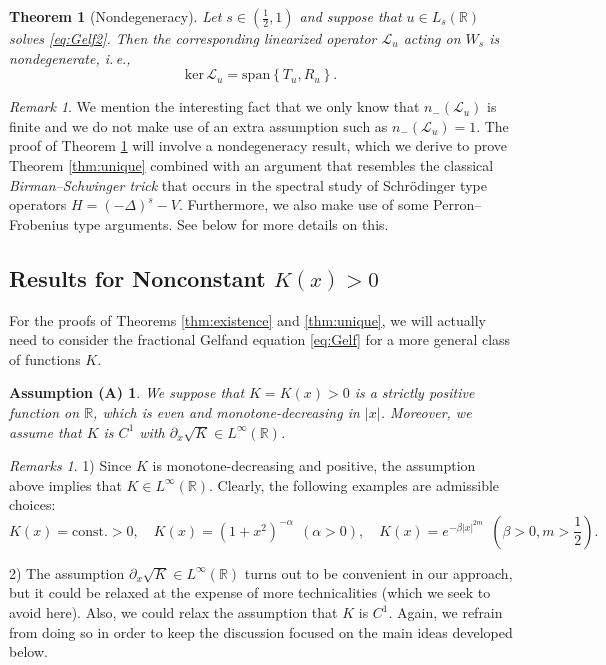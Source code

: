 \documentclass[reqno,10pt,a4paper]{amsart}
\newtheorem{thm}{Theorem}[section]
\newtheorem*{assum}{Assumption (A)}
\theoremstyle{definition}
\theoremstyle{definition}
\theoremstyle{remark}
\theoremstyle{remark}
\newtheorem*{remarks*}{Remarks}
\newtheorem*{remark*}{Remark}
\numberwithin{equation}{section}
\newcommand{\R}{\mathbb{R}}
\newcommand{\pt}{\partial}
\newcommand{\DD}{\Delta}
\newcommand{\LL}{\mathcal{L}}
\begin{document}
\begin{thm}[Nondegeneracy] \label{thm:nondeg}
Let $s \in (\frac 1 2,1)$ and suppose that $u \in L_s(\R)$ solves \eqref{eq:Gelf2}. Then the corresponding linearized operator $\LL_u$ acting on $W_s$ is nondegenerate, i.\,e., 
$$
\mathrm{ker} \, \LL_u = \mathrm{span} \left \{ T_u, R_u \right \}.
$$ 
\end{thm}

\begin{remark*}
We mention the interesting fact that we only know that $n_-(\LL_u)$ is finite and we do not make use of an extra assumption such as $n_-(\LL_u) =1$. The proof of Theorem \ref{thm:nondeg} will involve a nondegeneracy result, which we derive to prove Theorem \ref{thm:unique} combined with an argument that resembles the classical {\em Birman--Schwinger trick} that occurs in the spectral study of Schr\"odinger type operators $H=(-\DD)^s  -V$. Furthermore, we also make use of some Perron--Frobenius type arguments. See below for more details on this.
\end{remark*}


\subsection{Results for Nonconstant $K(x) >0$}

For the proofs of Theorems \ref{thm:existence} and \ref{thm:unique}, we will actually need to consider the fractional Gelfand equation \eqref{eq:Gelf} for a more general class of functions $K$.  

\begin{assum}
We suppose that $K=K(x)>0$ is a strictly positive function on $\R$, which is even and monotone-decreasing in $|x|$. Moreover, we assume that $K$ is $C^1$ with $\pt_x \sqrt{K} \in L^\infty(\R)$. 
\end{assum}

\begin{remarks*}
1) Since $K$ is monotone-decreasing and positive, the assumption above implies that $K \in L^\infty(\R)$. Clearly, the following examples are admissible choices:
$$
K(x) = \mbox{const.} > 0, \quad K(x) = (1+x^2)^{-\alpha} \ \ (\alpha > 0), \quad K(x) = e^{-\beta |x|^{2m}} \ \ (\mbox{$\beta >0, m > \frac{1}{2}$}).
$$

2) The assumption $\pt_x \sqrt{K} \in L^\infty(\R)$ turns out to be convenient in our approach, but it could be relaxed at the expense of more technicalities (which we seek to avoid here). Also, we could relax the assumption that $K$ is $C^1$. Again, we refrain from doing so  in order to keep the discussion focused on the main ideas developed below.  
\end{remarks*}
 
\end{document}
